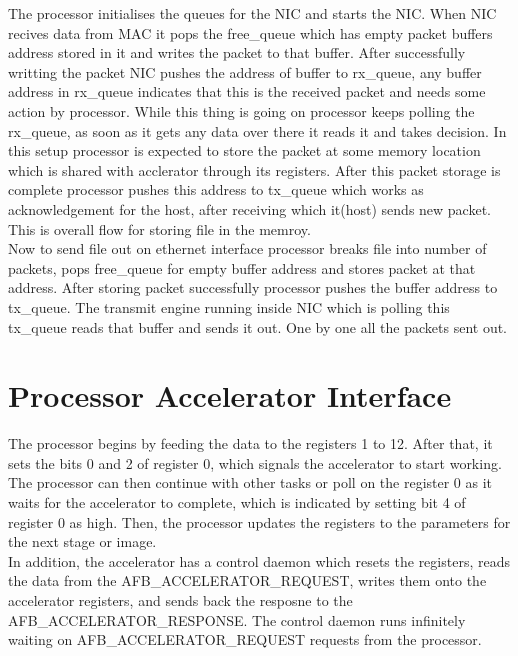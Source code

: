 \documentclass[a4paper,11pt, final]{report}
\begin{document}
The processor initialises the queues for the NIC and starts the NIC. When NIC recives data from MAC it pops the free\_queue which has empty packet buffers address stored in it and writes the packet to that buffer. After successfully writting the packet NIC pushes the address of buffer to rx\_queue, any buffer address in rx\_queue indicates that this is the received packet and needs some action by processor. While this thing is going on processor keeps polling the rx\_queue, as soon as it gets any data over there it reads it and takes decision. In this setup processor is expected to store the packet at some memory location which is shared with acclerator through its registers. After this packet storage is complete processor pushes this address to tx\_queue which works as acknowledgement for the host, after receiving which it(host) sends new packet. This is overall flow for storing file in the memroy.
\\

Now to send file out on ethernet interface processor breaks file into number of packets, pops free\_queue for empty buffer address and stores packet at that address. After storing packet successfully processor pushes the buffer address to tx\_queue. The transmit engine running inside NIC which is polling this tx\_queue reads that buffer and sends it out. One by one all the packets sent out.



\section{Processor Accelerator Interface}

The processor begins by feeding the data to the registers 1 to 12. After that, it sets the bits 0 and 2 of register 0, which signals the accelerator to start working. The processor can then continue with other tasks or poll on the register 0 as it waits for the accelerator to complete, which is indicated by setting bit 4 of register 0 as high. Then, the processor updates the registers to the parameters for the next stage or image.
\\

In addition, the accelerator has a control daemon which resets the registers, reads the data from the AFB\_ACCELERATOR\_REQUEST, writes them onto the accelerator registers, and sends back the resposne to the AFB\_ACCELERATOR\_RESPONSE. The control daemon runs infinitely waiting on AFB\_ACCELERATOR\_REQUEST requests from the processor.
\\
\end{document}
